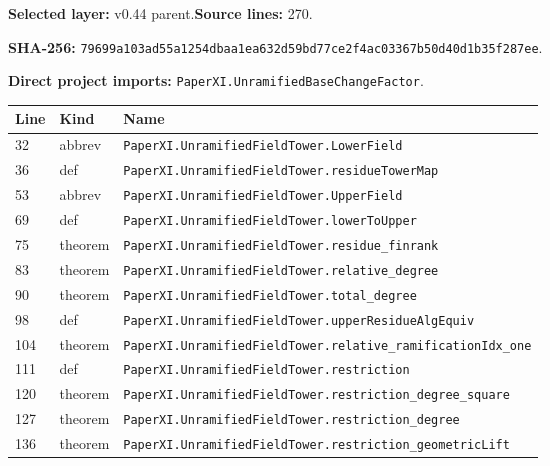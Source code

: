 \documentclass[10pt,oneside]{book}
\begin{document}
\textbf{Selected layer:} v0.44 parent.\quad\textbf{Source lines:} 270.\par\textbf{SHA-256:} {\scriptsize\nolinkurl{79699a103ad55a1254dbaa1ea632d59bd77ce2f4ac03367b50d40d1b35f287ee}}.


\textbf{Direct project imports:} \nolinkurl{PaperXI.UnramifiedBaseChangeFactor}.

\begin{longtable}{@{}p{}p{}p{}@{}}\toprule Line&Kind&Name\\\midrule\endhead

32&abbrev&\nolinkurl{PaperXI.UnramifiedFieldTower.LowerField}\\

36&def&\nolinkurl{PaperXI.UnramifiedFieldTower.residueTowerMap}\\

53&abbrev&\nolinkurl{PaperXI.UnramifiedFieldTower.UpperField}\\

69&def&\nolinkurl{PaperXI.UnramifiedFieldTower.lowerToUpper}\\

75&theorem&\nolinkurl{PaperXI.UnramifiedFieldTower.residue_finrank}\\

83&theorem&\nolinkurl{PaperXI.UnramifiedFieldTower.relative_degree}\\

90&theorem&\nolinkurl{PaperXI.UnramifiedFieldTower.total_degree}\\

98&def&\nolinkurl{PaperXI.UnramifiedFieldTower.upperResidueAlgEquiv}\\

104&theorem&\nolinkurl{PaperXI.UnramifiedFieldTower.relative_ramificationIdx_one}\\

111&def&\nolinkurl{PaperXI.UnramifiedFieldTower.restriction}\\

120&theorem&\nolinkurl{PaperXI.UnramifiedFieldTower.restriction_degree_square}\\

127&theorem&\nolinkurl{PaperXI.UnramifiedFieldTower.restriction_degree}\\

136&theorem&\nolinkurl{PaperXI.UnramifiedFieldTower.restriction_geometricLift}\\


\end{longtable}
\end{document}

